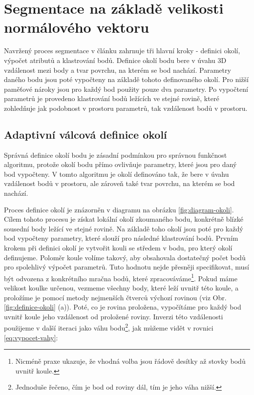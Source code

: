 \documentclass[11pt,twoside,a4paper]{book}
\begin{document}
\section{Segmentace na základě velikosti normálového vektoru}

Navržený proces segmentace v článku \cite{Seg01} zahrnuje tři hlavní kroky - definici okolí, výpočet atributů a klastrování bodů. Definice okolí bodu bere v úvahu 3D vzdálenost mezi body a tvar povrchu, na kterém se bod nachází. Parametry daného bodu jsou poté vypočteny na základě tohoto definovaného okolí. Pro nižší paměťové nároky jsou pro každý bod použity pouze dva parametry. Po vypočtení parametrů je provedeno klastrování bodů ležících ve stejné rovině, které zohledňuje jak podobnost v prostoru parametrů, tak vzdálenost bodů v prostoru.

\subsection{Adaptivní válcová definice okolí} 
\label{sub:def-okoli}

Správná definice okolí bodu je zásadní podmínkou pro správnou funkčnost algoritmu, protože okolí bodu přímo ovlivňuje parametry, které jsou pro daný bod vypočteny. V tomto algoritmu je okolí definováno tak, že bere v úvahu vzdálenost bodů v prostoru, ale zároveň také tvar povrchu, na kterém se bod nachází.

Proces definice okolí je znázorněn v diagramu na obrázku \ref{fig:diagram-okoli}. Cílem tohoto procesu je získat lokální okolí zkoumaného bodu, konkrétně blízké sousední body ležící ve stejné rovině. Na základě toho okolí jsou poté pro každý bod vypočteny parametry, které slouží pro následné klastrování bodů. Prvním krokem při definici okolí je vytvořit kouli se středem v bodu, pro který okolí definujeme. Poloměr koule volíme takový, aby obsahovala dostatečný počet bodů pro spolehlivý výpočet parametrů. Tuto hodnotu nejde přesněji specifikovat, musí být odvozena z konkrétního mračna bodů, které zpracováváme\footnote{Nicméně praxe ukazuje, že vhodná volba jsou řádově desítky až stovky bodů uvnitř koule.}. Pokud máme velikost koulke určenou, vezmeme všechny body, které leží uvnitř této koule, a proložíme je pomocí metody nejmenších čtverců výchozí rovinou (viz Obr. \ref{fig:definice-okoli} (a)). Poté, co je rovina proložena, vypočítáme pro každý bod uvnitř koule jeho vzdálenost od proložené roviny. Inverzi této vzdálenosti použijeme v další iteraci jako váhu bodu\footnote{Jednoduše řečeno, čím je bod od roviny dál, tím je jeho váha nižší.}, jak můžeme vidět v rovnici \ref{eq:vypocet-vahy}:
\end{document}
